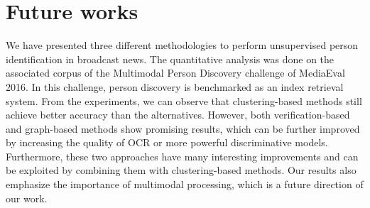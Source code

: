 \section{Future works}
\label{sec:discuss}

We have presented three different methodologies to perform unsupervised person identification in broadcast news. The quantitative analysis was done on the associated corpus of the Multimodal Person Discovery challenge of MediaEval 2016. In this challenge, person discovery is benchmarked as an index retrieval system.
%
From the experiments, we can observe that clustering-based methods still achieve better accuracy than the alternatives. However, both verification-based and graph-based methods show promising results, which can be further improved by increasing the quality of OCR or more powerful discriminative models. 
%
Furthermore, these two approaches have many interesting improvements and can be exploited by combining them with clustering-based methods.
%
Our results also emphasize the importance of multimodal processing, which is a future direction of our work.


\endinput
